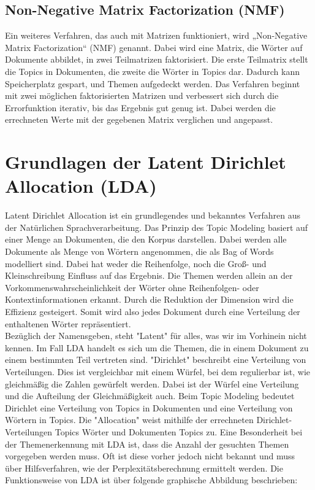 \documentclass[german,version-2020-11]{uzl-thesis}
\begin{document}
\subsection{Non-Negative Matrix Factorization (NMF)}
Ein weiteres Verfahren, das auch mit Matrizen funktioniert, wird „Non-Negative Matrix Factorization“ (NMF) genannt. Dabei wird eine Matrix, die Wörter auf Dokumente abbildet, in zwei Teilmatrizen faktorisiert. Die erste Teilmatrix stellt die Topics in Dokumenten, die zweite die Wörter in Topics dar. Dadurch kann Speicherplatz gespart, und Themen aufgedeckt werden. Das Verfahren beginnt mit zwei möglichen faktorisierten Matrizen und verbessert sich durch die Errorfunktion iterativ, bis das Ergebnis gut genug ist. Dabei werden die errechneten Werte mit der gegebenen Matrix verglichen und angepasst.


\section{Grundlagen der Latent Dirichlet Allocation (LDA)}
Latent Dirichlet Allocation ist ein grundlegendes und bekanntes Verfahren aus der Natürlichen Sprachverarbeitung. Das Prinzip des Topic Modeling basiert auf einer Menge an Dokumenten, die den Korpus darstellen. Dabei werden alle Dokumente als Menge von Wörtern angenommen, die als Bag of Words modelliert sind. Dabei hat weder die Reihenfolge, noch die Groß- und Kleinschreibung Einfluss auf das Ergebnis. Die Themen werden  allein an der Vorkommenswahrscheinlichkeit der Wörter ohne Reihenfolgen- oder Kontextinformationen erkannt. Durch die Reduktion der Dimension wird die Effizienz gesteigert. Somit wird also jedes Dokument durch eine Verteilung der enthaltenen Wörter repräsentiert.\\

Bezüglich der Namensgeben, steht "Latent" für alles, was wir im Vorhinein nicht kennen. Im Fall LDA handelt es sich um die Themen, die in einem Dokument zu einem bestimmten Teil vertreten sind. "Dirichlet" beschreibt eine Verteilung von Verteilungen. Dies ist vergleichbar mit einem Würfel, bei dem regulierbar ist, wie gleichmäßig die Zahlen gewürfelt werden. Dabei ist der Würfel eine Verteilung und die Aufteilung der Gleichmäßigkeit auch. Beim Topic Modeling bedeutet Dirichlet eine Verteilung von Topics in Dokumenten und eine Verteilung von Wörtern in Topics. Die "Allocation" weist  mithilfe der errechneten Dirichlet-Verteilungen Topics Wörter und Dokumenten Topics zu. Eine Besonderheit bei der Themenerkennung mit LDA ist, dass die Anzahl der gesuchten Themen  vorgegeben werden muss. Oft ist diese vorher jedoch nicht bekannt und muss über Hilfsverfahren, wie der Perplexitätsberechnung ermittelt werden. Die Funktionsweise von LDA ist über folgende graphische Abbildung beschrieben: \\
\end{document}
